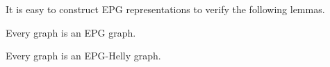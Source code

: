 \documentclass[runningheads]{llncs}
\begin{document}


 It is easy to construct EPG representations to verify the following lemmas.
 
 \begin{lemma} \cite{golumbic2009} \label{lem:todoGrafoEpg}
 Every graph is an EPG graph.
 \end{lemma}
 
 
 
 \begin{lemma}\label{lem:todoGrafoEpgHelly}
 Every graph is an EPG-Helly graph.
 \end{lemma}
  
\end{document}
